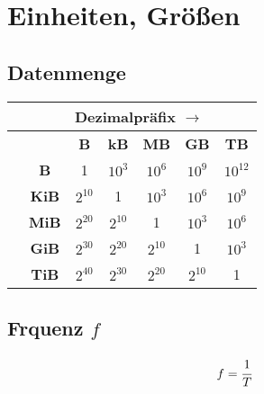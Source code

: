\section{Einheiten, Größen}

\subsection{Datenmenge}
\begin{center}
    \begin{tabular}{|c|c|c|c|c|c|c|}
        \hline\rule{0pt}{3ex}
        \space & \multicolumn{6}{c|}{Dezimalpräfix $\longrightarrow$}\\
        \hline\rule{0pt}{3ex}
        \multirow{6}{*}{\rot{$\longleftarrow$ Binärpräfix}} & \space        & \textbf{B}    & \textbf{kB}   & \textbf{MB}   & \textbf{GB}   & \textbf{TB}   \\
        \cline{2-7}\rule{0pt}{3ex}                          & \textbf{B}    & 1             & $10^{3}$      & $10^{6}$      & $10^{9}$      & $10^{12}$     \\
        \cline{2-7}\rule{0pt}{3ex}                          & \textbf{KiB}  & $2^{10}$      & 1             & $10^{3}$      & $10^{6}$      & $10^{9}$      \\
        \cline{2-7}\rule{0pt}{3ex}                          & \textbf{MiB}  & $2^{20}$      & $2^{10}$      & 1             & $10^{3}$      & $10^{6}$      \\
        \cline{2-7}\rule{0pt}{3ex}                          & \textbf{GiB}  & $2^{30}$      & $2^{20}$      & $2^{10}$      & 1             & $10^{3}$      \\
        \cline{2-7}\rule{0pt}{3ex}                          & \textbf{TiB}  & $2^{40}$      & $2^{30}$      & $2^{20}$      & $2^{10}$      & 1             \\
        \hline
    \end{tabular}
\end{center}

\subsection{Frquenz $f$}
\[
 f = \cfrac{1}{T}
\]
